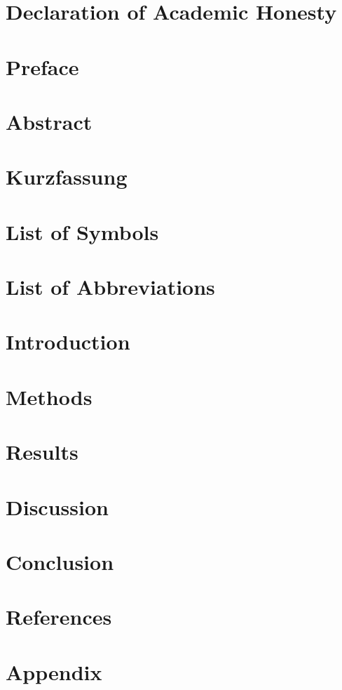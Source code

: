 \documentclass[12pt]{report}
\begin{document}


\chapter*{Declaration of Academic Honesty}

\chapter*{Preface}


\tableofcontents
\chapter*{Abstract}

\chapter*{Kurzfassung}

\listoffigures
{}
\chapter*{List of Symbols}

\listoftables
{}
\chapter*{List of Abbreviations}


\chapter{Introduction}

\chapter{Methods}

\chapter{Results}

\chapter{Discussion}

\chapter{Conclusion}


\chapter*{References}



\appendix
\chapter{Appendix}
{

}
\end{document}
